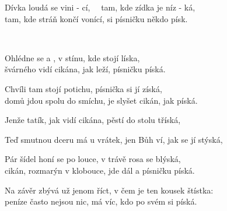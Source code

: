 
\ve{}
Dívka loudá se vini - cí, \ \ tam, kde zídka je níz - ká,\\
tam, kde stráň končí vonící, si písničku někdo písk.

\cho{}
\\

\ve{}
Ohlédne se a , v stínu, kde stojí líska,\\
švárného vidí cikána, jak leží, písničku píská.

\cho{}

\ve{}
Chvíli tam stojí potichu, písnička si jí získá,\\
domů jdou spolu do smíchu, je slyšet cikán, jak píská.

\cho{}

\ve{}
Jenže tatík, jak vidí cikána, pěstí do stolu tříská,\\

\cho{}

\ve{}
Teď smutnou dceru má u vrátek, jen Bůh ví, jak se jí stýská,\\

\ve{}Pár šídel honí se po louce, v trávě rosa se blýská,\\
cikán, rozmarýn v klobouce, jde dál a písničku píská.

\cho{}

\ve{}
Na závěr zbývá už jenom říct, v čem je ten kousek štístka:\\
peníze často nejsou nic, má víc, kdo po svém si píská.

\esong